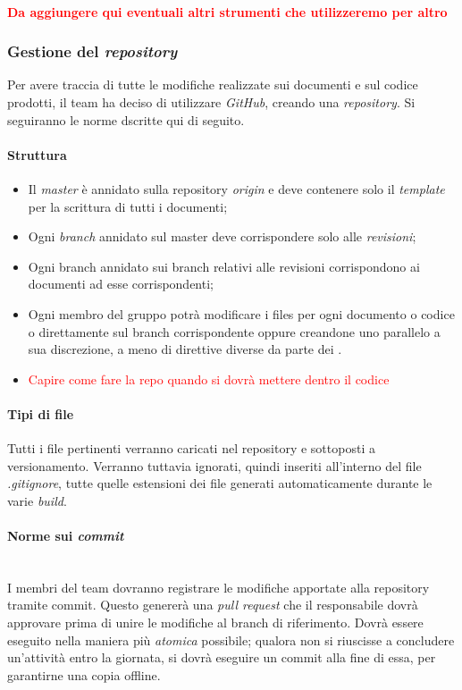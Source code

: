 			\paragraph{\textcolor{red}{Da aggiungere qui eventuali altri strumenti che utilizzeremo per altro}}
	
		\subsubsection{Gestione del \emph{repository}}
		Per avere traccia di tutte le modifiche realizzate sui documenti e sul codice prodotti, il team ha deciso di utilizzare \emph{GitHub}, creando una \emph{repository}. Si seguiranno le norme dscritte qui di seguito.
			\paragraph{Struttura}
			\begin{itemize}
				\item Il \emph{master} è annidato sulla repository \emph{origin} e deve contenere solo il \emph{template} per la scrittura di tutti i documenti;
				\item Ogni \emph{branch} annidato sul master deve corrispondere solo alle \emph{revisioni};
				\item Ogni branch annidato sui branch relativi alle revisioni corrispondono ai documenti ad esse corrispondenti;
				\item Ogni membro del gruppo potrà modificare i files per ogni documento o codice o direttamente sul branch corrispondente oppure creandone uno parallelo a sua discrezione, a meno di direttive diverse da parte dei \progs{}.
				\item \textcolor{red}{Capire come fare la repo quando si dovrà mettere dentro il codice}
			\end{itemize}
			\paragraph{Tipi di file}
			Tutti i file pertinenti verranno caricati nel repository e sottoposti a versionamento. Verranno tuttavia ignorati, quindi inseriti all'interno del file \emph{.gitignore}, tutte quelle estensioni dei file generati automaticamente durante le varie \emph{build}.
			\paragraph{Norme sui \emph{commit}}
			~\\I membri del team dovranno registrare le modifiche apportate alla repository tramite commit. Questo genererà una \emph{pull request} che il responsabile dovrà approvare prima di unire le modifiche al branch di riferimento. Dovrà essere eseguito nella maniera più \emph{atomica} possibile; qualora non si riuscisse a concludere un'attività entro la giornata, si dovrà eseguire un commit alla fine di essa, per garantirne una copia offline.
